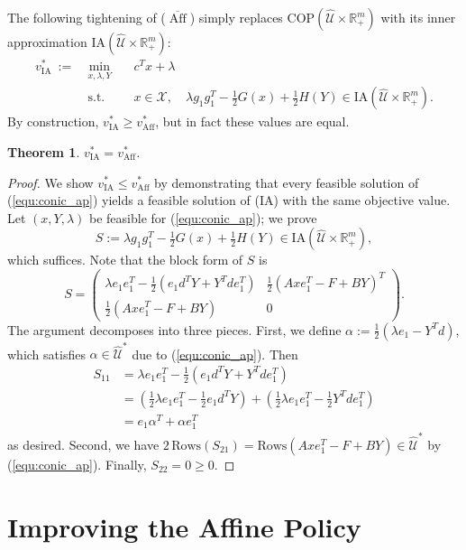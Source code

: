 \documentclass[12pt]{article}
\DeclareMathOperator{\st}{s.t.}
\DeclareMathOperator{\AP}{Aff}
\newtheorem{theorem}{Theorem}
\newcommand{\nin}{\noindent}
\newcommand{\K}{\widehat{\mathcal{U}}}
\newcommand{\COP}{{\mathrm{COP}}}
\newcommand{\X}{{\mathcal{X}}}
\newcommand{\M}{\mathrm{IA}}
\def\RR{{\mathbb{R}}}
\newcommand{\Q}{{\K \times \RR^m_+}}
\begin{document}
\begin{onehalfspace}
The following tightening of ($\overline{\AP}$) simply replaces $\COP(\Q)$
with its inner approximation $\M(\Q)$:
%
\begin{equation} \tag{$IA$} \label{equ:mcone_ap}
\begin{array}{lll}
v_{\M}^* \ := \ &\min \limits_{x,\lambda, Y} \quad &c^T x + \lambda \\
&\st &x \in \X, \quad \lambda g_1 g_1^T - \tfrac12 G(x) + \tfrac12 H(Y)
\in \M(\Q).
\end{array}
\end{equation}
%
\nin By construction, $v_{\M}^* \ge v_{\AP}^*$, but in fact these values
are equal.

\begin{theorem} \label{theorem:affine-tractable}
$v_{\M}^* = v_{\AP}^*$.
\end{theorem}

\begin{proof}
We show $v_{\M}^* \le v_{\AP}^*$ by demonstrating that every feasible
solution of (\ref{equ:conic_ap}) yields a feasible solution of ($\M$)
with the same objective value. Let $(x,Y,\lambda)$ be feasible for
(\ref{equ:conic_ap}); we prove 
\[
    S := \lambda g_1 g_1^T - \tfrac12 G(x) + \tfrac12 H(Y) \in \M(\Q),
\]
which suffices. Note that the block form of $S$ is
\[
    S = 
    \begin{pmatrix}
        \lambda e_1 e_1^T - \tfrac{1}{2}(e_1d^T Y + Y^T de_1^T) &
        \tfrac{1}{2}(Axe_1^T - F + BY)^T \\
        \tfrac{1}{2}(Axe_1^T - F + BY) & 0
    \end{pmatrix}.
\]
The argument decomposes into three
pieces. First, we define $\alpha := \tfrac{1}{2}(\lambda e_1 - Y^Td)$,
which satisfies $\alpha \in \K^*$ due to (\ref{equ:conic_ap}). Then
\begin{align*}
    S_{11}
    &= \lambda e_1 e_1^T - \tfrac{1}{2}(e_1 d^T Y + Y^T d e_1^T) \\
    &= \left( \tfrac12 \lambda e_1 e_1^T - \tfrac{1}{2} e_1 d^T Y \right) +
       \left( \tfrac12 \lambda e_1 e_1^T - \tfrac{1}{2}Y^T d e_1^T \right) \\
    &= e_1 \alpha^T + \alpha e_1^T
\end{align*}
as desired. Second, we have $2 \, \text{Rows}(S_{21}) =
\text{Rows}(Axe_1^T - F + BY) \in \K^*$ by (\ref{equ:conic_ap}).
Finally, $S_{22} = 0 \ge 0$.
\end{proof}

\section{Improving the Affine Policy} \label{sec:results}


\end{onehalfspace}
\end{document}
